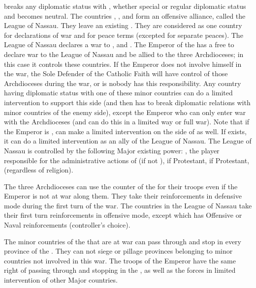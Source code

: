 \phevnt
\aparag \paysHollande breaks any diplomatic status with \SPA, whether special
\VASSAL or regular diplomatic status and becomes neutral.
\aparag The countries \paysOldenburg, \paysHanovre, \paysHanse and \paysBerg
form an offensive alliance, called the League of Nassau. They leave an
existing \GE.  They are considered as one country for declarations of war and
for peace terms (excepted for separate peaces).
\aparag The League of Nassau declares a war to \paysTreves, \paysCologne and
\paysMayence. The Emperor of the \HRE has a free \CB to declare war to the
League of Nassau and be allied to the three Archdioceses; in this case it
controls these countries. If the Emperor does not involve himself in the war,
the Sole Defender of the Catholic Faith will have control of those
Archdioceses during the war, or \SPA is nobody has this responsibility.
\aparag Any country having diplomatic status with one of these minor countries
can do a limited intervention to support this side (and then has to break
diplomatic relations with minor countries of the enemy side), except the
Emperor who can only enter war with the Archdioceses (and can do this in a
limited way or full war).
\bparag Note that if the Emperor is \AUSmin, \SPA can make a limited
intervention on the side of \AUSmin as well.
\aparag If \HOL exists, it can do a limited intervention as an ally of the
League of Nassau.
\aparag The League of Nassau is controlled by the following Major existing
power: \HOL, the player responsible for the administrative actions of
\payshollande (if not \SPA), \ENG if Protestant, \FRA if Protestant, \SUE
(regardless of religion).

\phadm
\aparag The three Archdioceses can use the counter of the \HRE for their
troops even if the Emperor is not at war along them. They take their
reinforcements in defensive mode during the first turn of the war.
\aparag The countries in the League of Nassau take their first turn
reinforcements in offensive mode, except \paysHanse which has Offensive or
Naval reinforcements (controller's choice).

\phmil
\aparag The minor countries of the \HRE that are at war can pass through and
stop in every province of the \HRE. They can not siege or pillage provinces
belonging to minor countries not involved in this war.
\aparag The troops of the Emperor have the same right of passing through and
stopping in the \HRE, as well as the forces in limited intervention of other
Major countries.

